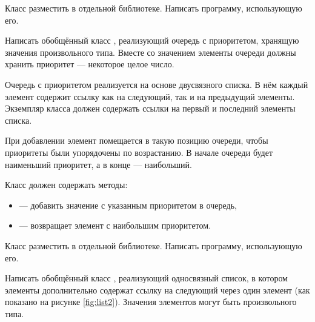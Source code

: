 Класс разместить в отдельной библиотеке. Написать программу,
использующую его.

\task Написать обобщённый класс , реализующий
очередь с приоритетом, хранящую значения
произвольного типа. Вместе со значением элементы очереди должны
хранить приоритет — некоторое целое число.

Очередь с приоритетом реализуется на основе двусвязного списка. В нём
каждый элемент содержит ссылку как на следующий, так и на предыдущий
элементы. Экземпляр класса должен содержать ссылки на первый и
последний элементы списка.

При добавлении элемент помещается в такую позицию очереди, чтобы
приоритеты были упорядочены по возрастанию. В начале очереди будет
наименьший приоритет, а в конце — наибольший.

Класс должен содержать методы:
\begin{itemize}
\item {} — добавить значение с указанным приоритетом в очередь,
\item {} — возвращает элемент с наибольшим приоритетом.
\end{itemize}

Класс разместить в отдельной библиотеке. Написать программу,
использующую его.

\task Написать обобщённый класс , реализующий
односвязный список, в котором элементы дополнительно содержат ссылку
на следующий через один элемент (как показано на рисунке
\ref{fig:list2}).  Значения элементов могут быть произвольного типа.

